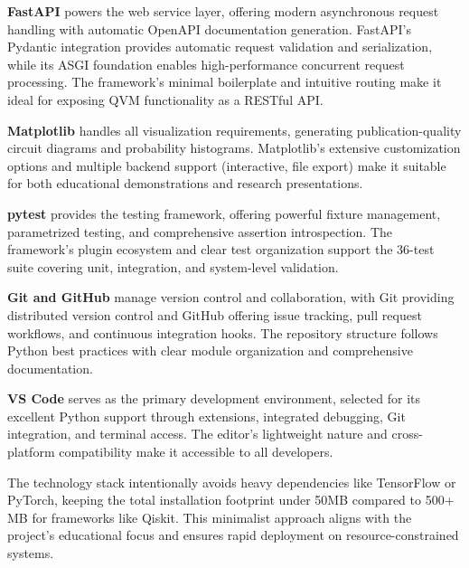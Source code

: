 \textbf{FastAPI} powers the web service layer, offering modern asynchronous request handling with automatic OpenAPI documentation generation. FastAPI's Pydantic integration provides automatic request validation and serialization, while its ASGI foundation enables high-performance concurrent request processing. The framework's minimal boilerplate and intuitive routing make it ideal for exposing QVM functionality as a RESTful API.

\textbf{Matplotlib} handles all visualization requirements, generating publication-quality circuit diagrams and probability histograms. Matplotlib's extensive customization options and multiple backend support (interactive, file export) make it suitable for both educational demonstrations and research presentations.

\textbf{pytest} provides the testing framework, offering powerful fixture management, parametrized testing, and comprehensive assertion introspection. The framework's plugin ecosystem and clear test organization support the 36-test suite covering unit, integration, and system-level validation.

\textbf{Git and GitHub} manage version control and collaboration, with Git providing distributed version control and GitHub offering issue tracking, pull request workflows, and continuous integration hooks. The repository structure follows Python best practices with clear module organization and comprehensive documentation.

\textbf{VS Code} serves as the primary development environment, selected for its excellent Python support through extensions, integrated debugging, Git integration, and terminal access. The editor's lightweight nature and cross-platform compatibility make it accessible to all developers.

The technology stack intentionally avoids heavy dependencies like TensorFlow or PyTorch, keeping the total installation footprint under 50MB compared to 500+ MB for frameworks like Qiskit. This minimalist approach aligns with the project's educational focus and ensures rapid deployment on resource-constrained systems.

